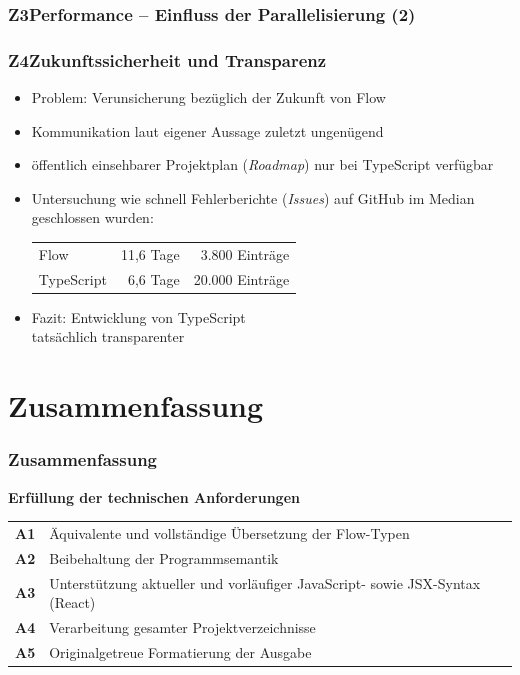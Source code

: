       \begin{frame}
        \frametitle{Z3\hspace{0.75em}Performance -- Einfluss der Parallelisierung (2)}
        
      \end{frame}

      \begin{frame}
        \frametitle{Z4\hspace{0.75em}Zukunftssicherheit und Transparenz}
        \begin{itemize}
          \item Problem: Verunsicherung bezüglich der Zukunft von Flow
          \item Kommunikation laut eigener Aussage zuletzt ungenügend~\autocite{FLOW:UPDATE_2019}
          \item öffentlich einsehbarer Projektplan (\textit{Roadmap}) nur bei TypeScript verfügbar
          \item Untersuchung wie schnell Fehlerberichte (\textit{Issues}) auf GitHub im Median geschlossen wurden:\\
            \vspace{.5em}
            {
              \footnotesize
              \begin{tabu}{@{}lrr@{}}
                Flow & 11,6 Tage & 3.800 Einträge \\
                TypeScript & 6,6 Tage & 20.000 Einträge \\
              \end{tabu}
            }
          \item Fazit: Entwicklung von TypeScript\\tatsächlich transparenter
        \end{itemize}
      \end{frame}

  \section{Zusammenfassung}

    \begin{frame}
      \frametitle{Zusammenfassung}
      \textbf{Erfüllung der technischen Anforderungen}\\[1em]
      {
        \renewcommand{\arraystretch}{1.4}
        \begin{tabu} to 
          \textbf{A1} & Äquivalente und vollständige Übersetzung der Flow-Typen \\
          \textbf{A2} & Beibehaltung der Programmsemantik \\
          \textbf{A3} & Unterstützung aktueller und vorläufiger JavaScript- sowie JSX-Syntax (React) \\
          \textbf{A4} & Verarbeitung gesamter Projektverzeichnisse \\
          \textbf{A5} & Originalgetreue Formatierung der Ausgabe \\
        \end{tabu}
      }
    \end{frame}

